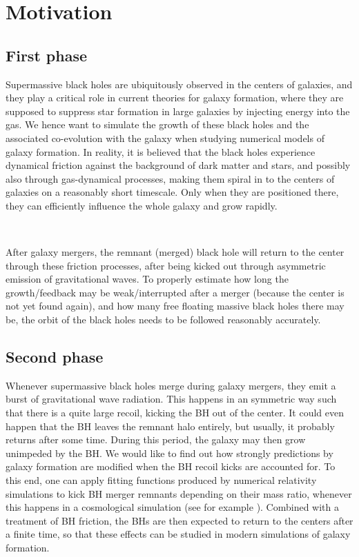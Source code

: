 \documentclass[a4,useAMS,usenatbib,usegraphicx,12pt]{article}
\begin{document}
\newpage

\section{Motivation}

\subsection*{First phase}

Supermassive black holes are ubiquitously observed in the centers of galaxies, 
and they play a critical role in current theories for galaxy formation, where 
they are supposed to suppress star formation in large galaxies by injecting 
energy into the gas. We hence want to simulate the growth of these black holes 
and the associated co-evolution with the galaxy when studying numerical models 
of galaxy formation. In reality, it is believed that the black holes experience 
dynamical friction against the background of dark matter and stars, and possibly 
also through gas-dynamical processes, making them spiral in to the centers of 
galaxies on a reasonably short timescale. Only when they are positioned there, 
they can efficiently influence the whole galaxy and grow rapidly. 

\

After galaxy mergers, the remnant (merged) black hole will return to the center 
through these friction processes, after being kicked out through asymmetric 
emission of gravitational waves. To properly estimate how long the growth/feedback 
may be weak/interrupted after a merger (because the center is not yet found again), 
and how many free floating massive black holes there may be, the orbit of the 
black holes needs to be followed reasonably accurately.

\subsection*{Second phase}

Whenever supermassive black holes merge during galaxy mergers, they emit a burst 
of gravitational wave radiation. This happens in an symmetric way such that there
is a quite large recoil, kicking the BH out of the center. It could even happen 
that the BH leaves the remnant halo entirely, but usually, it probably returns 
after some time. During this period, the galaxy may then grow unimpeded by the BH. 
We would like to find out how strongly predictions by galaxy formation are 
modified when the BH recoil kicks are accounted for. To this end, one can apply 
fitting functions produced by numerical relativity simulations to kick BH merger 
remnants depending on their mass ratio, whenever this happens in a cosmological 
simulation (see for example \citet{Sijacki2011}). 
Combined with a treatment of BH friction, the BHs are then expected to return to 
the centers after a finite time, so that these effects can be studied in modern 
simulations of galaxy formation.
\end{document}
